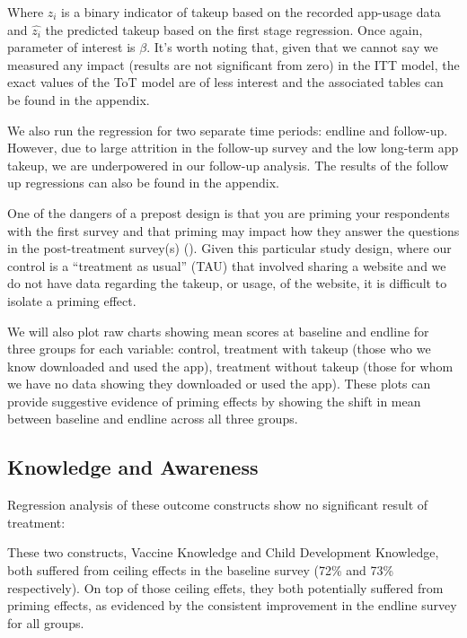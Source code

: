 \documentclass{article}
\begin{document}
Where $z_i$ is a binary indicator of takeup based on the recorded app-usage data and $\hat{z_i}$ the predicted takeup based on the first stage regression. Once again, parameter of interest is $\beta$. It's worth noting that, given that we cannot say we measured any impact (results are not significant from zero) in the ITT model, the exact values of the ToT model are of less interest and the associated tables can be found in the appendix.

We also run the regression for two separate time periods: endline and follow-up. However, due to large attrition in the follow-up survey and the low long-term app takeup, we are underpowered in our follow-up analysis. The results of the follow up regressions can also be found in the appendix.

One of the dangers of a prepost design is that you are priming your respondents with the first survey and that priming may impact how they answer the questions in the post-treatment survey(s) (\cite{Stantcheva2023}). Given this particular study design, where our control is a ``treatment as usual'' (TAU) that involved sharing a website and we do not have data regarding the takeup, or usage, of the website, it is difficult to isolate a priming effect.

We will also plot raw charts showing mean scores at baseline and endline for three groups for each variable: control, treatment with takeup (those who we know downloaded and used the app), treatment without takeup (those for whom we have no data showing they downloaded or used the app). These plots can provide suggestive evidence of priming effects by showing the shift in mean between baseline and endline across all three groups.

\subsection*{Knowledge and Awareness}

Regression analysis of these outcome constructs show no significant result of treatment:



These two constructs, Vaccine Knowledge and Child Development Knowledge, both suffered from ceiling effects in the baseline survey (72\% and 73\% respectively). On top of those ceiling effets, they both potentially suffered from priming effects, as evidenced by the consistent improvement in the endline survey for all groups.
\end{document}
